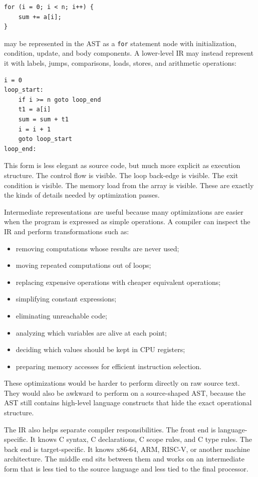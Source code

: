\begin{verbatim}
for (i = 0; i < n; i++) {
    sum += a[i];
}
\end{verbatim}

may be represented in the AST as a \texttt{for} statement node with initialization, condition, update, and body components. A lower-level IR may instead represent it with labels, jumps, comparisons, loads, stores, and arithmetic operations:

\begin{verbatim}
i = 0
loop_start:
    if i >= n goto loop_end
    t1 = a[i]
    sum = sum + t1
    i = i + 1
    goto loop_start
loop_end:
\end{verbatim}

This form is less elegant as source code, but much more explicit as execution structure. The control flow is visible. The loop back-edge is visible. The exit condition is visible. The memory load from the array is visible. These are exactly the kinds of details needed by optimization passes.

Intermediate representations are useful because many optimizations are easier when the program is expressed as simple operations. A compiler can inspect the IR and perform transformations such as:

\begin{itemize}
    \item removing computations whose results are never used;
    \item moving repeated computations out of loops;
    \item replacing expensive operations with cheaper equivalent operations;
    \item simplifying constant expressions;
    \item eliminating unreachable code;
    \item analyzing which variables are alive at each point;
    \item deciding which values should be kept in CPU registers;
    \item preparing memory accesses for efficient instruction selection.
\end{itemize}

These optimizations would be harder to perform directly on raw source text. They would also be awkward to perform on a source-shaped AST, because the AST still contains high-level language constructs that hide the exact operational structure.

The IR also helps separate compiler responsibilities. The front end is language-specific. It knows C syntax, C declarations, C scope rules, and C type rules. The back end is target-specific. It knows x86-64, ARM, RISC-V, or another machine architecture. The middle end sits between them and works on an intermediate form that is less tied to the source language and less tied to the final processor.

